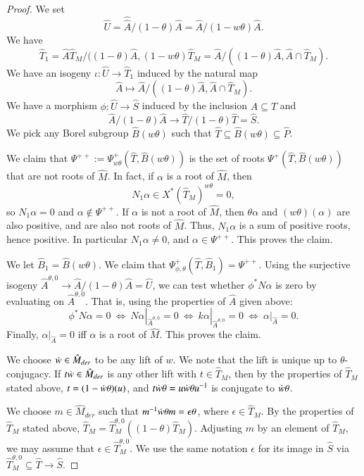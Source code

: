 \begin{proof}
We set 
\[
\hat U= \hat \hat A/(1-\theta)\hat A = \hat A/(1-w\theta)\hat A.
\]
We have 
\[
\hat T_1 = \hat A \hat T_M/((1-\theta)\hat A, (1-w\theta) \hat T_M
   = \hat A/((1-\theta)\hat A,\hat A\cap \hat T_M).
\]
We have an isogeny $\iota:\hat U\to\hat T_1$ induced by the natural map
\[
\hat A \mapsto  \hat A/((1-\theta)\hat A,\hat A\cap \hat T_M).
\]
We have a morphism $\phi:\hat U\to \hat S$ induced by the inclusion $\hat A\subseteq\hat T$
and
\[
\hat A/(1-\theta)\hat A \to \hat T/(1-\theta)\hat T = \hat S.
\]
We pick any Borel subgroup $\hat B(w\theta)$ such that $\hat
T\subseteq \hat B(w\theta) \subseteq \hat P$.

We claim that $\Psi^{++}:=\Psi^+_{w\theta}(\hat T,\hat B(w\theta))$ is the
set of roots $\Psi^+(\hat T,\hat B(w\theta))$ that are not roots of $\hat M$.
In fact, if $\alpha$ is a root of $\hat M$, then
\[
N_1 \alpha\in X^*(\hat T_M)^{w\theta}= 0,
\]
so $N_1\alpha=0$ and $\alpha\not\in\Psi^{++}$.  If $\alpha$ is not a root of
$\hat M$, then $\theta\alpha$ and $(w\theta)(\alpha)$ are also positive,
and are also not roots of $\hat M$.  Thus, $N_1\alpha$ is a sum of positive roots,
hence positive.  In particular $N_1\alpha\ne0$, and $\alpha\in \Psi^{++}$.
This proves the claim.

We let $\hat B_1 = \hat B(w\theta)$.  We claim that 
$\Psi_{\phi,\theta}^+(\hat T,\hat B_1) = \Psi^{++}$.
Using the surjective isogeny $\hat A^{\theta,0}\to \hat A/(1-\theta)\hat A= \hat U$, we
can test whether $\phi^* N\alpha$ is zero by evaluating on $\hat A^{\theta,0}$.
That is, using the properties of $\hat A$ given above:
\[
\phi^* N\alpha = 0 \ \Leftrightarrow \ 
N\alpha|_{\hat A^{\theta,0}}=0 \ \Leftrightarrow \ 
k\alpha|_{\hat A^{\theta,0}}=0 \ \Leftrightarrow \ 
\alpha|_{\hat A}=0.
\]
Finally, $\alpha|_{\hat A} = 0$ iff $\alpha$ is a root of $\hat M$.  This proves the claim.

We choose $\dot w\in \hat M_{der}$ to be any lift of $w$.  We note that
the lift is unique up to $\theta$-conjugacy.  If $t\dot w\in \hat
M_{der}$ is any other lift with $t\in \hat T_M$, then by the
properties of $\hat T_M$ stated above, $t = (1-\dot w\theta) (u)$,
and $t\dot w\theta = u\dot w\theta u^{-1}$ is conjugate to $\dot w\theta$.

We choose $m\in \hat M_{der}$ such that $m^{-1} \dot w\theta m = \epsilon
\theta$, where $\epsilon \in \hat T_M$.  By the properties of $\hat
T_M$ stated above, $\hat T_M = \hat T_M^{\theta,0} ((1-\theta)\hat
T_M)$.  Adjusting $m$ by an element of $\hat T_M$, we may assume that
$\epsilon\in \hat T_M^{\theta,0}$.  We use the same notation
$\epsilon$ for its image in $\hat S$ via $\hat T_M^{\theta,0}\subseteq
\hat T \to \hat S$.


\end{proof}
